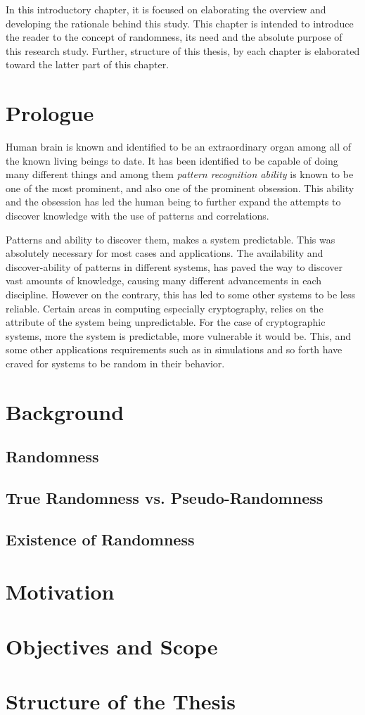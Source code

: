 In this introductory chapter, it is focused on elaborating the overview and developing the rationale behind this study. This chapter is intended to introduce the reader to the concept of randomness, its need and the absolute purpose of this research study. Further, structure of this thesis, by each chapter is elaborated toward the latter part of this chapter.

\section{Prologue}

Human brain is known and identified to be an extraordinary organ among all of the known living beings to date. It has been identified to be capable of doing many different things and among them \textit{pattern recognition ability} is known to be one of the most prominent, and also one of the prominent obsession. This ability and the obsession has led the human being to further expand the attempts to discover knowledge with the use of patterns and correlations.

Patterns and ability to discover them, makes a system predictable. This was absolutely necessary for most cases and applications. The availability and discover-ability of patterns in different systems, has paved the way to discover vast amounts of knowledge, causing many different advancements in each discipline.  However on the contrary, this has led to some other systems to be less reliable. Certain areas in computing especially cryptography, relies on the attribute of the system being unpredictable. For the case of cryptographic systems, more the system is predictable, more vulnerable it would be. This, and some other applications requirements such as in simulations and so forth have craved for systems to be random in their behavior.

\section{Background}

\subsection{Randomness}

\subsection{True Randomness vs. Pseudo-Randomness}

\subsection{Existence of Randomness}

\section{Motivation}

\section{Objectives and Scope}

\section{Structure of the Thesis}